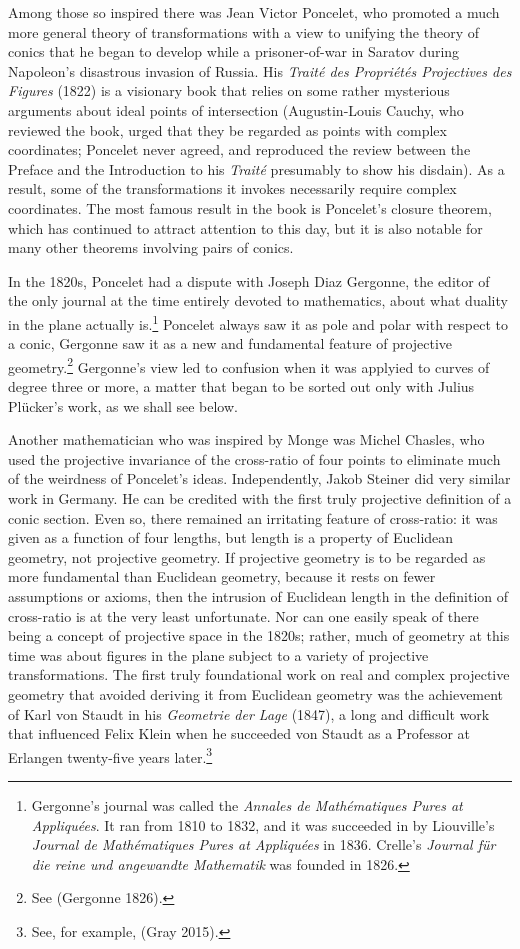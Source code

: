 Among those so inspired there was Jean Victor Poncelet, who promoted a much more general theory of transformations with a view to unifying the theory of conics that he began to develop while a prisoner-of-war in Saratov during Napoleon's disastrous invasion of Russia. His \emph{Trait\'e des Propri\'et\'es Projectives des Figures} (1822) is a visionary book that relies on some rather mysterious arguments about ideal points of intersection (Augustin-Louis Cauchy, who reviewed the book, urged that they be regarded as points with complex coordinates; Poncelet never agreed, and reproduced the review between the Preface and the Introduction to his \emph{Trait\'e}  presumably to show his disdain). As a result, some of the transformations it invokes necessarily require complex coordinates. The most famous result in the book is Poncelet's closure theorem, which has continued to attract attention to this day, but it is also notable for many other theorems involving pairs of conics.


In the 1820s, Poncelet had a dispute with Joseph Diaz Gergonne, the editor of the only journal at the time entirely devoted to mathematics, about what duality in the plane actually is.\footnote{Gergonne's journal was called the \emph{Annales de Math\'ematiques Pures at Appliqu\'ees}. It ran from 1810 to 1832, and  it was succeeded in by Liouville's \emph{Journal de Math\'ematiques Pures at Appliqu\'ees} in 1836. Crelle's \emph{Journal f\"ur die reine und angewandte Mathematik} was founded in 1826.}
Poncelet always saw it as pole and polar with respect to a conic, Gergonne saw it as a new and fundamental feature of projective geometry.\footnote{See (Gergonne 1826).} Gergonne's view led to confusion when it was applyied to curves of degree three or more, a matter that began to be sorted out only with Julius Pl\"ucker's work, as we shall see below.


Another mathematician who was inspired by Monge was Michel Chasles, who used the projective invariance of the cross-ratio of four points to eliminate much of the weirdness of Poncelet's ideas. Independently, Jakob Steiner did very similar work in Germany. He can be credited with the first truly projective definition of a conic section. Even so, there remained an irritating feature of cross-ratio: it was given as a function of four lengths, but length is a property of Euclidean geometry, not projective geometry.  If projective geometry is to be regarded as more fundamental than Euclidean geometry, because it rests on fewer assumptions or axioms, then the intrusion of Euclidean length in the definition of cross-ratio is at the very least unfortunate. Nor can one easily speak of there being a concept of projective space in the 1820s; rather, much of geometry at this time was about figures in the plane subject to a variety of projective transformations. The first truly foundational work on real and complex projective geometry that avoided deriving it from Euclidean geometry was the achievement of Karl von Staudt in his \emph{Geometrie der Lage} (1847), a long and difficult work that influenced Felix Klein when he succeeded von Staudt as a Professor at Erlangen twenty-five years later.\footnote{See, for example, (Gray 2015).}

